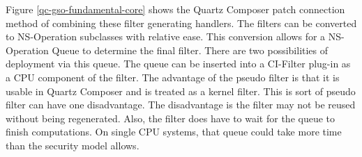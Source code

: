 \documentclass[11pt]{article}
\begin{document}







Figure  \ref{qc-gso-fundamental-core} shows the Quartz Composer patch connection method of combining these filter generating handlers.  The filters can be converted to NS-Operation subclasses with relative ease.  This conversion allows for a NS-Operation Queue to determine the final filter.  There are two possibilities of deployment via this queue.  The queue can be inserted into a CI-Filter plug-in as a CPU component of the filter.    The advantage of the pseudo filter is that it is usable in Quartz Composer and is treated as a kernel filter. This is sort of  pseudo filter can have one disadvantage.  The disadvantage is the filter may not be reused without being regenerated.  Also, the filter does have to wait for the queue to finish computations.  On single CPU systems, that queue could take more time than the security model allows.   










\end{document}
